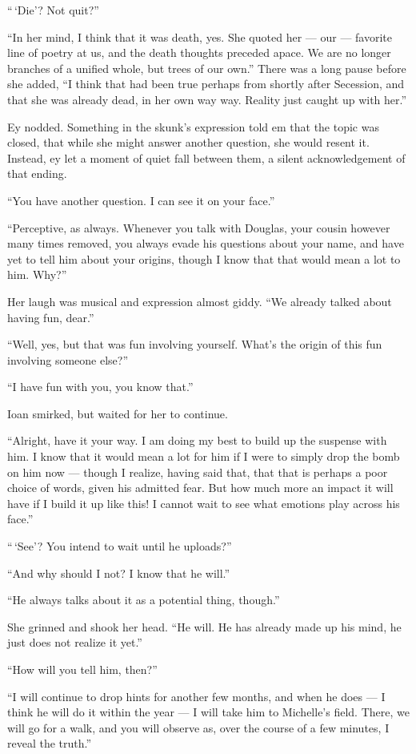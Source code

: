 ``\,`Die'? Not quit?''

``In her mind, I think that it was death, yes. She quoted her — our — favorite line of poetry at us, and the death thoughts preceded apace. We are no longer branches of a unified whole, but trees of our own.'' There was a long pause before she added, ``I think that had been true perhaps from shortly after Secession, and that she was already dead, in her own way way. Reality just caught up with her.''

Ey nodded. Something in the skunk's expression told em that the topic was closed, that while she might answer another question, she would resent it. Instead, ey let a moment of quiet fall between them, a silent acknowledgement of that ending.

``You have another question. I can see it on your face.''

``Perceptive, as always. Whenever you talk with Douglas, your cousin however many times removed, you always evade his questions about your name, and have yet to tell him about your origins, though I know that that would mean a lot to him. Why?''

Her laugh was musical and expression almost giddy. ``We already talked about having fun, dear.''

``Well, yes, but that was fun involving yourself. What's the origin of this fun involving someone else?''

``I have fun with you, you know that.''

Ioan smirked, but waited for her to continue.

``Alright, have it your way. I am doing my best to build up the suspense with him. I know that it would mean a lot for him if I were to simply drop the bomb on him now — though I realize, having said that, that that is perhaps a poor choice of words, given his admitted fear. But how much more an impact it will have if I build it up like this! I cannot wait to see what emotions play across his face.''

``\,`See'? You intend to wait until he uploads?''

``And why should I not? I know that he will.''

``He always talks about it as a potential thing, though.''

She grinned and shook her head. ``He will. He has already made up his mind, he just does not realize it yet.''

``How will you tell him, then?''

``I will continue to drop hints for another few months, and when he does — I think he will do it within the year — I will take him to Michelle's field. There, we will go for a walk, and you will observe as, over the course of a few minutes, I reveal the truth.''

